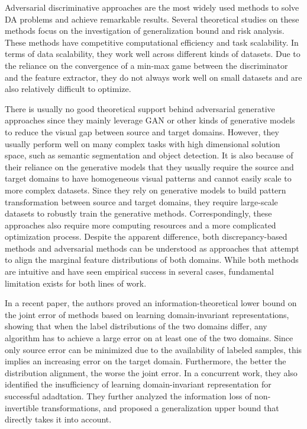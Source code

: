 \documentclass[conference]{IEEEtran}
\begin{document}
Adversarial discriminative approaches are the most widely used methods to solve
DA problems and achieve remarkable results. Several theoretical studies on these methods
focus on the investigation of generalization bound and risk analysis.
These methods have competitive computational efficiency and task scalability.
In terms of data scalability, they work well across different kinds of datasets.
Due to the reliance on the convergence of a min-max game between the discriminator and 
the feature extractor, they do not always work well on small datasets and are 
also relatively difficult to optimize.

There is usually no good theoretical support behind adversarial generative 
approaches since they mainly leverage GAN or other kinds of generative models to 
reduce the visual gap between source and target domains. 
However, they usually perform well on many complex tasks with high dimensional
solution space, such as semantic segmentation and object detection.
It is also because of their reliance on the generative models that they usually
require the source and target domains to have homogeneous visual patterns 
and cannot easily scale to more complex datasets.
Since they rely on generative models to build pattern transformation between
source and target domains, they require large-scale datasets to robustly train 
the generative methods.
Correspondingly, these approaches also require more computing resources and a 
more complicated optimization process.
Despite the apparent difference, both discrepancy-based methods and adversarial methods
can be understood as approaches that attempt to align the marginal feature distributions
of both domains. 
While both methods are intuitive and have seen empirical success in several cases, 
fundamental limitation exists for both lines of work.

In a recent paper, the authors proved an information-theoretical lower bound
on the joint error of methods based on learning domain-invariant representations, 
showing that when the label distributions of the two domains differ, any 
algorithm has to achieve a large error on at least one of the two domains.
Since only source error can be minimized due to the availability of labeled samples,
this implies an increasing error on the target domain.
Furthermore, the better the distribution alignment, the worse the joint error.
In a concurrent work, they also identified the insufficiency of learning domain-invariant 
representation for successful adadtation.
They further analyzed the information loss of non-invertible transformations, and 
proposed a generalization upper bound that directly takes it into account.
\end{document}
